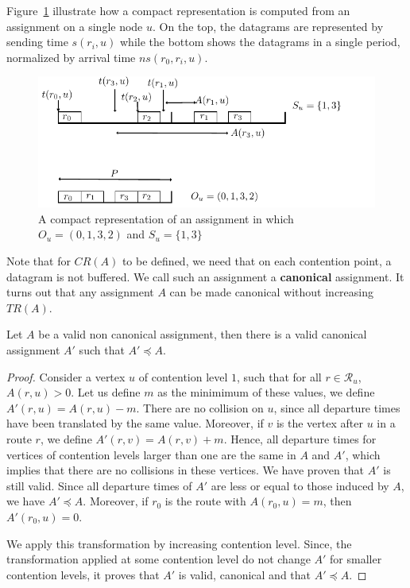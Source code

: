 \documentclass[english]{article}
\begin{document}
Figure~\ref{fig:normalizedassignment} illustrate how a compact representation is computed from an assignment on a single node $u$. On the top, the datagrams are represented by sending time $s(r_i,u)$ while the bottom shows the datagrams in a single period, normalized by arrival time $ns(r_0,r_i,u)$.  
\begin{figure}[!h]
	\centering
	\includegraphics[scale=1]{normalizedassignment}
\caption{A compact representation of an assignment in which $O_u = (0,1,3,2)$ and $S_u = \{1,3\}$ }
\label{fig:normalizedassignment}
\end{figure}


Note that for $CR(A)$ to be defined, we need that on each contention point, a datagram is not buffered. We call such an assignment a \textbf{canonical} assignment. It turns out that any assignment $A$ can be made canonical without increasing $TR(A)$.

\begin{lemma}\label{lemma:canonical_min}
Let $A$ be a valid non canonical assignment, then there is a valid canonical assignment $A'$ such that $A' \preceq A$.
\end{lemma}
\begin{proof}
Consider a vertex $u$ of contention level $1$, such that for all $r \in \mathcal{R}_u$, $A(r,u) > 0$. Let us define $m$ as the minimimum of these values, we define $A'(r,u) = A(r,u) - m$. There are no collision on $u$, since all departure times have been translated by the same value. Moreover, if $v$ is the vertex after $u$ in a route $r$, we define  $A'(r,v) = A(r,v) + m$. Hence, all departure times for vertices of contention levels larger than one are the same in $A$ and $A'$, which implies that there are no collisions in these vertices. We have proven that $A'$ is still valid. Since all departure times of $A'$ are less or equal to those induced by $A$, we have $A' \preceq A$. Moreover, if $r_0$ is the route with $A(r_0,u) = m$, then $A'(r_0,u) = 0$. 

We apply this transformation by increasing contention level. Since, the transformation applied at some contention level do not change $A'$ for smaller contention levels, it proves that $A'$ is valid, canonical and that $A' \preceq A$.
\end{proof}
\end{document}
